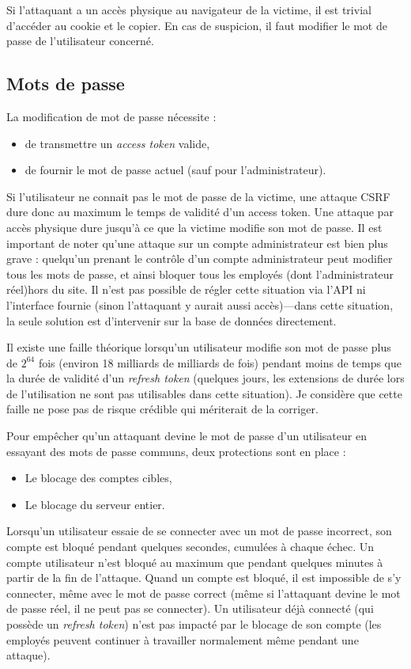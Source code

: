 Si l’attaquant a un accès physique au navigateur de la victime, il est trivial d’accéder au cookie et le copier.
En cas de suspicion, il faut modifier le mot de passe de l’utilisateur concerné.

\subsection{Mots de passe}\label{subsec:mots-de-passe}

La modification de mot de passe nécessite :
\begin{itemize}
	\item de transmettre un \emph{access token} valide,
	\item de fournir le mot de passe actuel (sauf pour l'administrateur).
\end{itemize}

Si l’utilisateur ne connait pas le mot de passe de la victime, une attaque CSRF dure donc au maximum le temps de validité d’un access token.
Une attaque par accès physique dure jusqu’à ce que la victime modifie son mot de passe.
Il est important de noter qu’une attaque sur un compte administrateur est bien plus grave :
quelqu’un prenant le contrôle d’un compte administrateur peut modifier tous les mots de passe, et ainsi bloquer tous les employés (dont l’administrateur réel)hors du site.
Il n’est pas possible de régler cette situation via l’API ni l’interface fournie (sinon l’attaquant y aurait aussi accès)---dans cette situation, la seule solution est d'intervenir sur la base de données directement.

Il existe une faille théorique lorsqu’un utilisateur modifie son mot de passe plus de $2^{64}$ fois (environ 18 milliards de milliards de fois) pendant moins de temps que la durée de validité d’un \emph{refresh token} (quelques jours, les extensions de durée lors de l’utilisation ne sont pas utilisables dans cette situation).
Je considère que cette faille ne pose pas de risque crédible qui mériterait de la corriger.

\uparagraph
Pour empêcher qu’un attaquant devine le mot de passe d’un utilisateur en essayant des mots de passe communs, deux protections sont en place :
\begin{itemize}
	\item Le blocage des comptes cibles,
	\item Le blocage du serveur entier.
\end{itemize}

Lorsqu’un utilisateur essaie de se connecter avec un mot de passe incorrect, son compte est bloqué pendant quelques secondes, cumulées à chaque échec.
Un compte utilisateur n’est bloqué au maximum que pendant quelques minutes à partir de la fin de l’attaque.
Quand un compte est bloqué, il est impossible de s’y connecter, même avec le mot de passe correct (même si l’attaquant devine le mot de passe réel, il ne peut pas se connecter).
Un utilisateur déjà connecté (qui possède un \emph{refresh token}) n’est pas impacté par le blocage de son compte (les employés peuvent continuer à travailler normalement même pendant une attaque).

